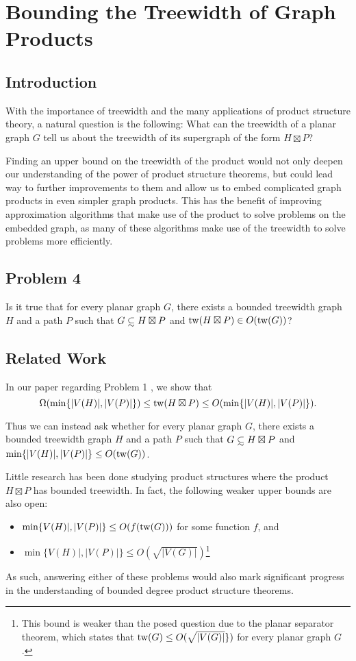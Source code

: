\documentclass[../main.tex]{subfiles}
\begin{document}
	
	\section{Bounding the Treewidth of Graph Products}
	\subsection{Introduction}
	With the importance of treewidth and the many applications of product structure theory, a natural question is the following: What can the treewidth of a planar graph $G$ tell us about the treewidth of its supergraph of the form $H\boxtimes P$?
	
	Finding an upper bound on the treewidth of the product would not only deepen our understanding of the power of product structure theorems, but could lead way to further improvements to them and allow us to embed complicated graph products in even simpler graph products. This has the benefit of improving approximation algorithms 
	that make use of the product to solve problems on the embedded graph, as many of these algorithms make use of the treewidth to solve problems more efficiently. 
	\subsection{Problem 4}
	  Is it true that for every planar graph $G$, there exists a bounded treewidth graph $H$ and a path $P$ such that $G \subsetsim H\boxtimes P$ and $\operatorname{tw}(H\boxtimes P) \in O(\operatorname{tw}(G))$? 
	
	\subsection{Related Work}
	In our paper regarding Problem 1 \cite[Lemma~3, Equation~(2)]{DMWW24}, we show that $$\Omega(\min\{|V(H)|,|V(P)|\})\leq  \operatorname{tw}( H\boxtimes P) \leq O(\min\{|V(H)|,|V(P)|\}).$$ 
	
	Thus we can instead ask whether for every planar graph $G$, there exists a bounded treewidth graph $H$ and a path $P$ such that $G\subsetsim H\boxtimes P$ and $\min\{|V(H)|,|V(P)|\} \leq O(\operatorname{tw}(G))$. 
	
	Little research has been done studying product structures where the  product $H\boxtimes P$ has bounded treewidth. In fact, the following weaker upper bounds are also open:
	\begin{itemize}
	\item$\min\{V(H)|,|V(P)|\} \leq O(f(\operatorname{tw}(G)))$ for some function $f$, and
	\item $\min\{V(H)|,|V(P)|\} \leq O(\sqrt{|V(G)|})$\footnote{This bound is weaker than the posed question due to the planar separator theorem\cite{LT79}, which states that $\operatorname{tw}(G) \le O(\sqrt{|V(G)|}\})$ for every planar graph $G$.}
	\end{itemize} 
	As such, answering either of these problems would also mark significant progress in the understanding of bounded degree product structure theorems.
	
\end{document}
